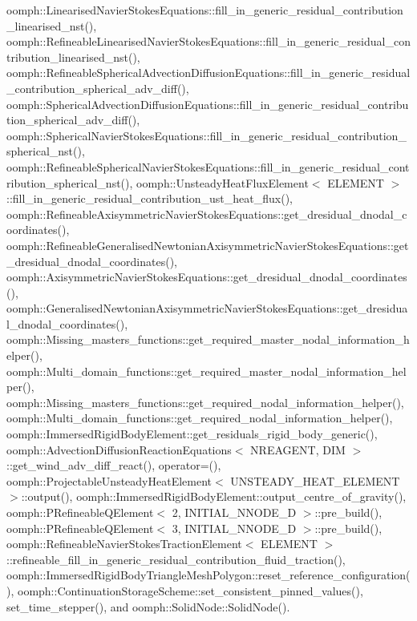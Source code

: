 oomph\+::\+Linearised\+Navier\+Stokes\+Equations\+::fill\+\_\+in\+\_\+generic\+\_\+residual\+\_\+contribution\+\_\+linearised\+\_\+nst(), oomph\+::\+Refineable\+Linearised\+Navier\+Stokes\+Equations\+::fill\+\_\+in\+\_\+generic\+\_\+residual\+\_\+contribution\+\_\+linearised\+\_\+nst(), oomph\+::\+Refineable\+Spherical\+Advection\+Diffusion\+Equations\+::fill\+\_\+in\+\_\+generic\+\_\+residual\+\_\+contribution\+\_\+spherical\+\_\+adv\+\_\+diff(), oomph\+::\+Spherical\+Advection\+Diffusion\+Equations\+::fill\+\_\+in\+\_\+generic\+\_\+residual\+\_\+contribution\+\_\+spherical\+\_\+adv\+\_\+diff(), oomph\+::\+Spherical\+Navier\+Stokes\+Equations\+::fill\+\_\+in\+\_\+generic\+\_\+residual\+\_\+contribution\+\_\+spherical\+\_\+nst(), oomph\+::\+Refineable\+Spherical\+Navier\+Stokes\+Equations\+::fill\+\_\+in\+\_\+generic\+\_\+residual\+\_\+contribution\+\_\+spherical\+\_\+nst(), oomph\+::\+Unsteady\+Heat\+Flux\+Element$<$ E\+L\+E\+M\+E\+N\+T $>$\+::fill\+\_\+in\+\_\+generic\+\_\+residual\+\_\+contribution\+\_\+ust\+\_\+heat\+\_\+flux(), oomph\+::\+Refineable\+Axisymmetric\+Navier\+Stokes\+Equations\+::get\+\_\+dresidual\+\_\+dnodal\+\_\+coordinates(), oomph\+::\+Refineable\+Generalised\+Newtonian\+Axisymmetric\+Navier\+Stokes\+Equations\+::get\+\_\+dresidual\+\_\+dnodal\+\_\+coordinates(), oomph\+::\+Axisymmetric\+Navier\+Stokes\+Equations\+::get\+\_\+dresidual\+\_\+dnodal\+\_\+coordinates(), oomph\+::\+Generalised\+Newtonian\+Axisymmetric\+Navier\+Stokes\+Equations\+::get\+\_\+dresidual\+\_\+dnodal\+\_\+coordinates(), oomph\+::\+Missing\+\_\+masters\+\_\+functions\+::get\+\_\+required\+\_\+master\+\_\+nodal\+\_\+information\+\_\+helper(), oomph\+::\+Multi\+\_\+domain\+\_\+functions\+::get\+\_\+required\+\_\+master\+\_\+nodal\+\_\+information\+\_\+helper(), oomph\+::\+Missing\+\_\+masters\+\_\+functions\+::get\+\_\+required\+\_\+nodal\+\_\+information\+\_\+helper(), oomph\+::\+Multi\+\_\+domain\+\_\+functions\+::get\+\_\+required\+\_\+nodal\+\_\+information\+\_\+helper(), oomph\+::\+Immersed\+Rigid\+Body\+Element\+::get\+\_\+residuals\+\_\+rigid\+\_\+body\+\_\+generic(), oomph\+::\+Advection\+Diffusion\+Reaction\+Equations$<$ N\+R\+E\+A\+G\+E\+N\+T, D\+I\+M $>$\+::get\+\_\+wind\+\_\+adv\+\_\+diff\+\_\+react(), operator=(), oomph\+::\+Projectable\+Unsteady\+Heat\+Element$<$ U\+N\+S\+T\+E\+A\+D\+Y\+\_\+\+H\+E\+A\+T\+\_\+\+E\+L\+E\+M\+E\+N\+T $>$\+::output(), oomph\+::\+Immersed\+Rigid\+Body\+Element\+::output\+\_\+centre\+\_\+of\+\_\+gravity(), oomph\+::\+P\+Refineable\+Q\+Element$<$ 2, I\+N\+I\+T\+I\+A\+L\+\_\+\+N\+N\+O\+D\+E\+\_\+D $>$\+::pre\+\_\+build(), oomph\+::\+P\+Refineable\+Q\+Element$<$ 3, I\+N\+I\+T\+I\+A\+L\+\_\+\+N\+N\+O\+D\+E\+\_\+D $>$\+::pre\+\_\+build(), oomph\+::\+Refineable\+Navier\+Stokes\+Traction\+Element$<$ E\+L\+E\+M\+E\+N\+T $>$\+::refineable\+\_\+fill\+\_\+in\+\_\+generic\+\_\+residual\+\_\+contribution\+\_\+fluid\+\_\+traction(), oomph\+::\+Immersed\+Rigid\+Body\+Triangle\+Mesh\+Polygon\+::reset\+\_\+reference\+\_\+configuration(), oomph\+::\+Continuation\+Storage\+Scheme\+::set\+\_\+consistent\+\_\+pinned\+\_\+values(), set\+\_\+time\+\_\+stepper(), and oomph\+::\+Solid\+Node\+::\+Solid\+Node().

